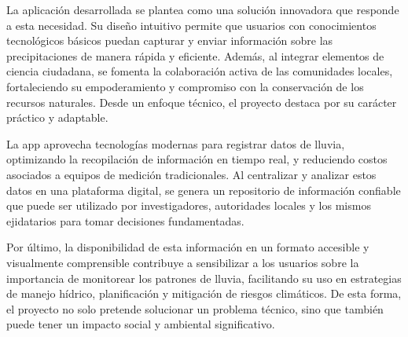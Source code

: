 La aplicación desarrollada se plantea como una solución innovadora que responde a esta necesidad. Su diseño intuitivo permite que usuarios con conocimientos tecnológicos básicos puedan capturar y enviar información sobre las precipitaciones de manera rápida y eficiente. Además, al integrar elementos de ciencia ciudadana, se fomenta la colaboración activa de las comunidades locales, fortaleciendo su empoderamiento y compromiso con la conservación de los recursos naturales. Desde un enfoque técnico, el proyecto destaca por su carácter práctico y adaptable.

La app aprovecha tecnologías modernas para registrar datos de lluvia, optimizando la recopilación de información en tiempo real, y reduciendo costos asociados a equipos de medición tradicionales. Al centralizar y analizar estos datos en una plataforma digital, se genera un repositorio de información confiable que puede ser utilizado por investigadores, autoridades locales y los mismos ejidatarios para tomar
decisiones fundamentadas.

Por último, la disponibilidad de esta información en un formato accesible y visualmente comprensible contribuye a sensibilizar a los usuarios sobre la importancia de monitorear los patrones de lluvia, facilitando su uso en estrategias de manejo hídrico, planificación y mitigación de riesgos climáticos. De esta forma, el proyecto no solo pretende solucionar un problema técnico, sino que también puede tener un impacto social y ambiental significativo.








